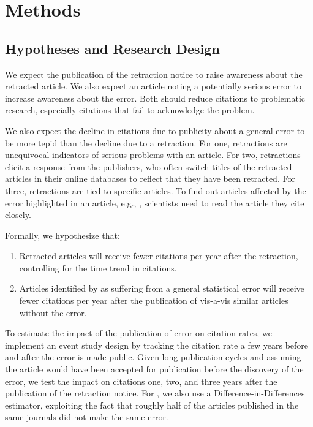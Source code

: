 \documentclass[12pt, letterpaper]{article}
\begin{document}
\section{Methods}

\subsection{Hypotheses and Research Design}

We expect the publication of the retraction notice to raise awareness about the retracted article. We also expect an article noting a potentially serious error to increase awareness about the error. Both should reduce citations to problematic research, especially citations that fail to acknowledge the problem.

We also expect the decline in citations due to publicity about a general error to be more tepid than the decline due to a retraction. For one, retractions are unequivocal indicators of serious problems with an article. For two, retractions elicit a response from the publishers, who often switch titles of the retracted articles in their online databases to reflect that they have been retracted. For three, retractions are tied to specific articles. To find out articles affected by the error highlighted in an article, e.g., \citet{nieuwenhuis2011}, scientists need to read the article they cite closely.

Formally, we hypothesize that:
\begin{enumerate}
	\item Retracted articles will receive fewer citations per year after the retraction, controlling for the time trend in citations.
	\item Articles identified by \citet{nieuwenhuis2011} as suffering from a general statistical error will receive fewer citations per year after the publication of  \citet{nieuwenhuis2011} vis-a-vis similar articles without the error.
\end{enumerate}

To estimate the impact of the publication of error on citation rates, we implement an event study design by tracking the citation rate a few years before and after the error is made public. Given long publication cycles and assuming the article would have been accepted for publication before the discovery of the error, we test the impact on citations one, two, and three years after the publication of the retraction notice. For \citet{nieuwenhuis2011}, we also use a Difference-in-Differences estimator, exploiting the fact that roughly half of the articles published in the same journals did not make the same error. 
\end{document}
